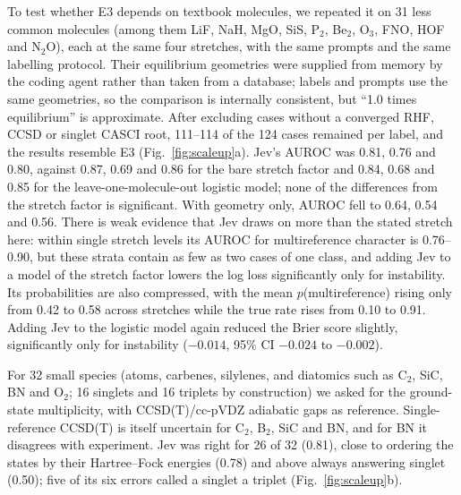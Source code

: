 \documentclass[11pt]{article}
\newcommand{\jev}{Jev}
\begin{document}
To test whether E3 depends on textbook molecules, we repeated it on 31 less common molecules (among them LiF, NaH, MgO, SiS, P$_2$, Be$_2$, O$_3$, FNO, HOF and N$_2$O), each at the same four stretches, with the same prompts and the same labelling protocol. Their equilibrium geometries were supplied from memory by the coding agent rather than taken from a database; labels and prompts use the same geometries, so the comparison is internally consistent, but ``1.0 times equilibrium'' is approximate.
After excluding cases without a converged RHF, CCSD or singlet CASCI root, 111--114 of the 124 cases remained per label, and the results resemble E3 (Fig.~\ref{fig:scaleup}a).
\jev{}'s AUROC was 0.81, 0.76 and 0.80, against 0.87, 0.69 and 0.86 for the bare stretch factor and 0.84, 0.68 and 0.85 for the leave-one-molecule-out logistic model; none of the differences from the stretch factor is significant.
With geometry only, AUROC fell to 0.64, 0.54 and 0.56.
There is weak evidence that \jev{} draws on more than the stated stretch here: within single stretch levels its AUROC for multireference character is 0.76--0.90, but these strata contain as few as two cases of one class, and adding \jev{} to a model of the stretch factor lowers the log loss significantly only for instability. Its probabilities are also compressed, with the mean $p$(multireference) rising only from 0.42 to 0.58 across stretches while the true rate rises from 0.10 to 0.91.
Adding \jev{} to the logistic model again reduced the Brier score slightly, significantly only for instability ($-0.014$, 95\% CI $-0.024$ to $-0.002$).

For 32 small species (atoms, carbenes, silylenes, and diatomics such as C$_2$, SiC, BN and O$_2$; 16 singlets and 16 triplets by construction) we asked for the ground-state multiplicity, with CCSD(T)/cc-pVDZ adiabatic gaps as reference. Single-reference CCSD(T) is itself uncertain for C$_2$, B$_2$, SiC and BN, and for BN it disagrees with experiment.
\jev{} was right for 26 of 32 (0.81), close to ordering the states by their Hartree--Fock energies (0.78) and above always answering singlet (0.50); five of its six errors called a singlet a triplet (Fig.~\ref{fig:scaleup}b).
\end{document}
